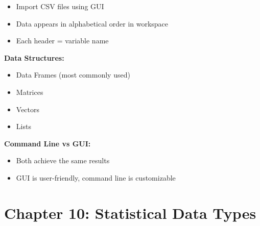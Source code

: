\documentclass[
  letterpaper,
  DIV=11,
  numbers=noendperiod]{scrreprt}
\newenvironment{Shaded}{\begin{snugshade}}{\end{snugshade}}
\newcommand{\CommentTok}[1]{\textcolor[rgb]{0.37,0.37,0.37}{#1}}
\newcommand{\FunctionTok}[1]{\textcolor[rgb]{0.28,0.35,0.67}{#1}}
\newcommand{\NormalTok}[1]{\textcolor[rgb]{0.00,0.23,0.31}{#1}}
\newcommand{\SpecialCharTok}[1]{\textcolor[rgb]{0.37,0.37,0.37}{#1}}
\providecommand{\tightlist}{%
  \setlength{\itemsep}{0pt}\setlength{\parskip}{0pt}}
\begin{document}
\begin{itemize}
\tightlist
\item
  Import CSV files using GUI\\
\item
  Data appears in alphabetical order in workspace\\
\item
  Each header = variable name
\end{itemize}

\textbf{Data Structures:}

\begin{itemize}
\tightlist
\item
  Data Frames (most commonly used)\\
\item
  Matrices\\
\item
  Vectors\\
\item
  Lists
\end{itemize}

\textbf{Command Line vs GUI:}

\begin{itemize}
\tightlist
\item
  Both achieve the same results\\
\item
  GUI is user-friendly, command line is customizable
\end{itemize}

\begin{Shaded}
\end{Shaded}


\chapter{Chapter 10: Statistical Data
Types}\label{chapter-10-statistical-data-types}
\end{document}
